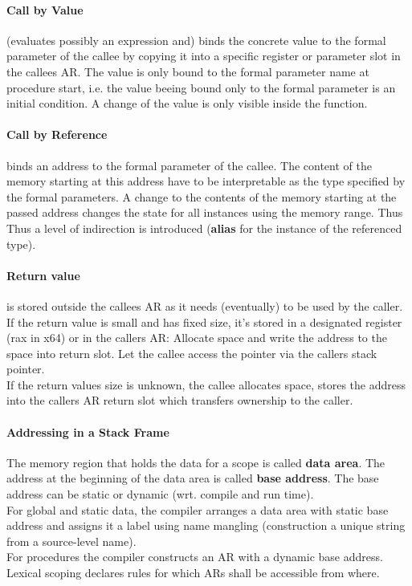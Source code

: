 \paragraph{Call by Value} (evaluates possibly an expression and) binds the concrete value to the formal parameter of the callee by copying it into a specific register or parameter slot in the callees AR. The value is only bound to the formal parameter name at procedure start, i.e. the value beeing bound only to the formal parameter is an initial condition. A change of the value is only visible inside the function. \\

\paragraph{Call by Reference} binds an address to the formal parameter of the callee. The content of the memory starting at this address have to be interpretable as the type specified by the formal parameters. A change to the contents of the memory starting at the passed address changes the state for all instances using the memory range. Thus  Thus a level of indirection is introduced (\textbf{alias} for the instance of the referenced type). \\

\paragraph{Return value} is stored outside the callees AR as it needs (eventually) to be used by the caller. \\
If the return value is small and has fixed size, it's stored in a designated register (rax in x64) or in the callers AR: Allocate space and write the address to the space into return slot. Let the callee access the pointer via the callers stack pointer. \\
If the return values size is unknown, the callee allocates space, stores the address into the callers AR return slot which transfers ownership to the caller.

\paragraph{Addressing in a Stack Frame} The memory region that holds the data for a scope is called \textbf{data area}. The address at the beginning of the data area is called \textbf{base address}. The base address can be static or dynamic (wrt. compile and run time). \\
For global and static data, the compiler arranges a data area with static base address and assigns it a label using name mangling (construction a unique string from a source-level name). \\
For procedures the compiler constructs an AR with a dynamic base address. Lexical scoping declares rules for which ARs shall be accessible from where. \\

